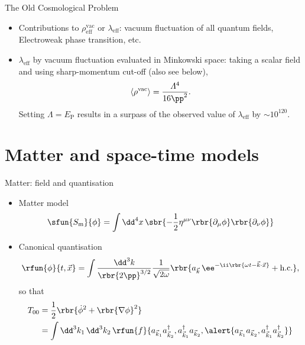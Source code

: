 \documentclass{beamer}
\begin{document}
\begin{frame}{The Old Cosmological Problem}
\begin{itemize}

\item Contributions to $\rho^\text{vac}_\text{eff}$ or $\lambda_\text{eff}$:
vacuum fluctuation of all quantum fields, Electroweak phase transition, etc.

\item $\lambda_\text{eff}$ by vacuum fluctuation evaluated in Minkowski space:
taking a scalar field and using sharp-momentum cut-off (also see below),
\begin{equation}
\left<\rho^\text{vac}\right> = \frac{\varLambda^4}{16\pp^2}.
\end{equation}
Setting $\varLambda = E_\text{P}$ results in a surpass of the observed value of
$\lambda_\text{eff}$ by $\sim 10^{120}$.

\end{itemize}

\end{frame}

\section{Matter and space-time models}

\begin{frame}{Matter: field and quantisation}

\begin{itemize}
\item Matter model
\begin{equation}
\sfun{S_\text{m}}{\phi} = \int \dd^4 x\,\sbr{-\frac{1}{2}\eta^{\mu\nu}
\rbr{\partial_\mu \phi}\rbr{\partial_\nu \phi}}
\label{eq:matter-classical}
\end{equation}
\item Canonical quantisation
\begin{equation}
\rfun{\phi}{t,\vec{x}} = \int\frac{\dd^3 k}{\rbr{2\pp}^{3/2}} 
\frac{1}{\sqrt{2\omega}}
\rbr{a_{\vec{k}} \,\ee^{-\ii\rbr{\omega t - \vec{k}\cdot\vec{x}}} + 
\text{h.c.}},
\label{eq:matter-quantised}
\end{equation}
so that
\begin{align}
T_{00} &= \frac{1}{2}\rbr{\dot{\phi}^2 + \rbr{\nabla\phi}^2} \\
&= \int\dd^3 k_1\,\dd^3 k_2\,
\rfun{f}{a_{\vec{k}_1} a_{\vec{k}_2}^\dagger, a_{\vec{k}_1}^\dagger 
a_{\vec{k}_2}, \alert{a_{\vec{k}_1} a_{\vec{k}_2}, a_{\vec{k}_1}^\dagger 
a_{\vec{k}_2}^\dagger}}
\end{align}
\end{itemize}


\end{frame}
\end{document}
